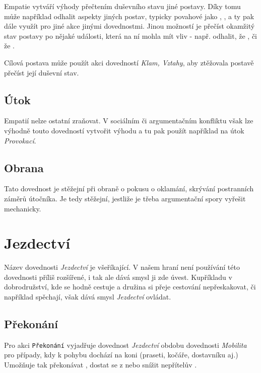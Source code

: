 \documentclass[../main.tex]{subfiles}
\begin{document}
Empatie vytváří výhody přečtením duševního stavu jiné postavy. Díky tomu může například odhalit aspekty jiných postav, typicky povahové jako , ,  a ty pak dále využít pro jiné akce jinými dovednostmi. Jinou možností je přečíst okamžitý stav postavy po nějaké události, která na ní mohla mít vliv - např. odhalit, že , či že .

Cílová postava může použít akci  dovedností \textit{Klam, Vztahy}, aby ztěžovala postavě přečíst její duševní stav.

\subsection*{Útok}
\label{subsec:empatie-utok}
\utok

Empatií nelze ostatní zraňovat. V sociálním či argumentačním konfliktu však lze výhodně touto dovedností vytvořit výhodu a tu pak použít například na útok \textit{Provokací}.

\subsection*{Obrana}
\label{subsec:empatie-obrana}
\obrana

Tato dovednost je stěžejní při obraně o pokusu o oklamání, skrývání postranních záměrů útočníka. Je tedy stěžejní, jestliže je třeba argumentační spory vyřešit mechanicky.

\section{Jezdectví}
\label{sec:jezdectvi}

Název dovednosti \textit{Jezdectví} je všeříkající. V našem hraní není používání této dovednosti příliš rozšířené, i tak ale dává smysl ji zde úvest. Kupříkladu v dobrodružství, kde se hodně cestuje a družina si přeje cestování nepřeskakovat, či například spěchají, však dává smysl \textit{Jezdectví} ovládat.

\subsection*{Překonání}
\label{subsec:jezdectvi-prekonani}
\prekonani

Pro akci \texttt{Překonání} vyjadřuje dovednost \textit{Jezdectví} obdobu dovednosti \textit{Mobilita} pro případy, kdy k pohybu dochází na koni (praseti, kočáře, dostavníku aj.) Umožňuje tak překonávat , dostat se z  nebo snížit nepřítelův . 
\end{document}
